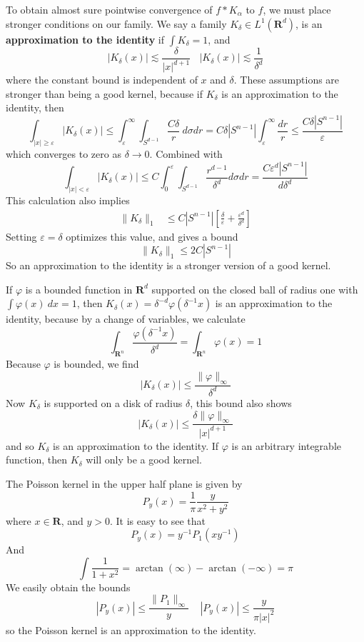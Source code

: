 To obtain almost sure pointwise convergence of $f * K_\alpha$ to $f$, we must place stronger conditions on our family. We say a family $K_\delta \in L^1(\mathbf{R}^d)$, is an {\bf approximation to the identity} if $\int K_\delta = 1$, and
%
\[ |K_\delta(x)| \lesssim \frac{\delta}{|x|^{d+1}}\ \ \ \ |K_\delta(x)| \lesssim \frac{1}{\delta^d} \]
%
where the constant bound is independent of $x$ and $\delta$. These assumptions are stronger than being a good kernel, because if $K_\delta$ is an approximation to the identity, then
%
\[ \int_{|x| \geq \varepsilon} |K_\delta(x)| \leq \int_\varepsilon^\infty \int_{S^{d-1}} \frac{C \delta}{r}\ d\sigma dr = C \delta |S^{n-1}| \int_\varepsilon^\infty \frac{dr}{r} \leq \frac{C \delta |S^{n-1}|}{\varepsilon} \]
%
which converges to zero as $\delta \to 0$. Combined with
%
\[ \int_{|x| < \varepsilon} |K_\delta(x)| \leq C \int_0^\varepsilon \int_{S^{d-1}} \frac{r^{d-1}}{\delta^d} d\sigma dr = \frac{C \varepsilon^d |S^{n-1}|}{d \delta^d} \]
%
This calculation also implies
%
\begin{align*}
    \| K_\delta \|_1 &\leq C |S^{n-1}| \left[ \frac{\delta}{\varepsilon} + \frac{\varepsilon^d}{\delta^d} \right]
\end{align*}
%
Setting $\varepsilon = \delta$ optimizes this value, and gives a bound
%
\[ \| K_\delta \|_1 \leq 2C |S^{n-1}| \]
%
So an approximation to the identity is a stronger version of a good kernel.

\begin{example}
    If $\varphi$ is a bounded function in $\mathbf{R}^d$ supported on the closed ball of radius one with $\int \varphi(x)\ dx = 1$, then $K_\delta(x) = \delta^{-d} \varphi(\delta^{-1}x)$ is an approximation to the identity, because by a change of variables, we calculate
    \[ \int_{\mathbf{R}^n} \frac{\varphi(\delta^{-1}x)}{\delta^d} = \int_{\mathbf{R}^n} \varphi(x) = 1 \]
    Because $\varphi$ is bounded, we find
    \[ |K_\delta(x)| \leq \frac{\| \varphi \|_\infty}{\delta^d} \]
    Now $K_\delta$ is supported on a disk of radius $\delta$, this bound also shows
    \[ |K_\delta(x)| \leq \frac{\delta \| \varphi \|_\infty}{|x|^{d+1}} \]
    and so $K_\delta$ is an approximation to the identity. If $\varphi$ is an arbitrary integrable function, then $K_\delta$ will only be a good kernel.
\end{example}

\begin{example}
    The Poisson kernel in the upper half plane is given by
    \[ P_y(x) = \frac{1}{\pi} \frac{y}{x^2 + y^2} \]
    where $x \in \mathbf{R}$, and $y > 0$. It is easy to see that
    \[ P_y(x) = y^{-1} P_1(xy^{-1}) \]
    And
    \[ \int \frac{1}{1 + x^2} = \arctan(\infty) - \arctan(-\infty) = \pi \]
    We easily obtain the bounds
    \[ |P_y(x)| \leq \frac{\| P_1 \|_\infty}{y}\ \ \ \ \ |P_y(x)| \leq \frac{y}{\pi |x|^2} \]
    so the Poisson kernel is an approximation to the identity.
\end{example}

